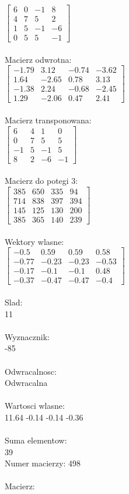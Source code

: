 \documentclass[a4paper,12pt]{article}
\begin{document}
$\begin{bmatrix} 6&0&-1&8\\4&7&5&2\\1&5&-1&-6\\0&5&5&-1 \end{bmatrix}$
\\
\\
Macierz odwrotna:\\

$\begin{bmatrix} -1.79&3.12&-0.74&-3.62\\1.64&-2.65&0.78&3.13\\-1.38&2.24&-0.68&-2.45\\1.29&-2.06&0.47&2.41 \end{bmatrix}$
\\
\\
Macierz transponowana:\\

$\begin{bmatrix} 6&4&1&0\\0&7&5&5\\-1&5&-1&5\\8&2&-6&-1 \end{bmatrix}$
\\
\\
Macierz do potegi 3:\\

$\begin{bmatrix} 385&650&335&94\\714&838&397&394\\145&125&130&200\\385&365&140&239 \end{bmatrix}$
\\
\\
Wektory wlasne:\\

$\begin{bmatrix} -0.5&0.59&0.59&0.58\\-0.77&-0.23&-0.23&-0.53\\-0.17&-0.1&-0.1&0.48\\-0.37&-0.47&-0.47&-0.4 \end{bmatrix}$
\\
\\
Slad:\\
11
\\
\\
Wyznacznik:\\
-85
\\
\\
Odwracalnosc:\\
Odwracalna
\\
\\
Wartosci wlasne:\\
11.64 -0.14 -0.14 -0.36
\\
\\
Suma elementow:\\
39
\\
\newpage
Numer macierzy:
498
\\
\\
Macierz:\\
\end{document}
